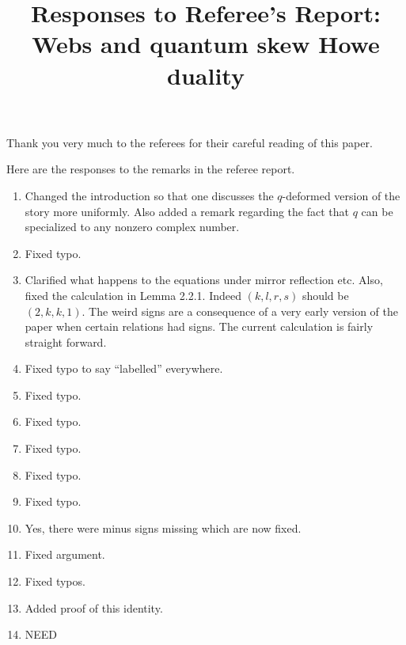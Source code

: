 \documentclass{amsart}
\title{Responses to Referee's Report: Webs and quantum skew Howe duality}
\begin{document}
\maketitle 



Thank you very much to the referees for their careful reading of this paper.



Here are the responses to the remarks in the referee report. 



\begin{enumerate}

\item Changed the introduction so that one discusses the $q$-deformed version of the story more uniformly. Also added a remark regarding the fact that $q$ can be specialized to any nonzero complex number. 

\item Fixed typo.

\item Clarified what happens to the equations under mirror reflection etc. Also, fixed the calculation in Lemma 2.2.1. Indeed $(k,l,r,s)$ should be $(2,k,k,1)$. The weird signs are a consequence of a very early version of the paper when certain relations had signs. The current calculation is fairly straight forward. 

\item Fixed typo to say ``labelled'' everywhere. 

\item Fixed typo.

\item Fixed typo.

\item Fixed typo.

\item Fixed typo.

\item Fixed typo.

\item Yes, there were minus signs missing which are now fixed. 

\item Fixed argument. 

\item Fixed typos. 

\item Added proof of this identity.

\item NEED


\end{enumerate}
\end{document}
